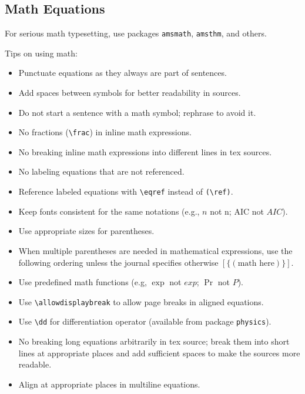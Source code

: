\documentclass[
]{book}
\providecommand{\tightlist}{%
  \setlength{\itemsep}{0pt}\setlength{\parskip}{0pt}}
\theoremstyle{definition}
\theoremstyle{definition}
\theoremstyle{definition}
\theoremstyle{definition}
\theoremstyle{remark}
\begin{document}
\subsection{Math Equations}\label{math-equations}

For serious math typesetting, use packages \texttt{amsmath}, \texttt{amsthm}, and others.

Tips on using math:

\begin{itemize}
\tightlist
\item
  Punctuate equations as they always are part of sentences.
\item
  Add spaces between symbols for better readability in sources.
\item
  Do not start a sentence with a math symbol; rephrase to avoid it.
\item
  No fractions (\texttt{\textbackslash{}frac}) in inline math expressions.
\item
  No breaking inline math expressions into different lines in tex sources.
\item
  No labeling equations that are not referenced.
\item
  Reference labeled equations with \texttt{\textbackslash{}eqref} instead of \texttt{(\textbackslash{}ref)}.
\item
  Keep fonts consistent for the same notations (e.g., \(n\) not n;
  AIC not \(AIC\)).
\item
  Use appropriate sizes for parentheses.
\item
  When multiple parentheses are needed in mathematical expressions, use the
  following ordering unless the journal specifies otherwise \([\{(\mbox{math here})\}].\)
\item
  Use predefined math functions (e.g, \(\exp\) not \(exp\); \(\Pr\) not \(P\)).
\item
  Use \texttt{\textbackslash{}allowdisplaybreak} to allow page breaks in aligned equations.
\item
  Use \texttt{\textbackslash{}dd} for differentiation operator (available from package \texttt{physics}).
\item
  No breaking long equations arbitrarily in tex source; break them into short
  lines at appropriate places and add sufficient spaces to make the sources more
  readable.
\item
  Align at appropriate places in multiline equations.
\end{itemize}
\end{document}
